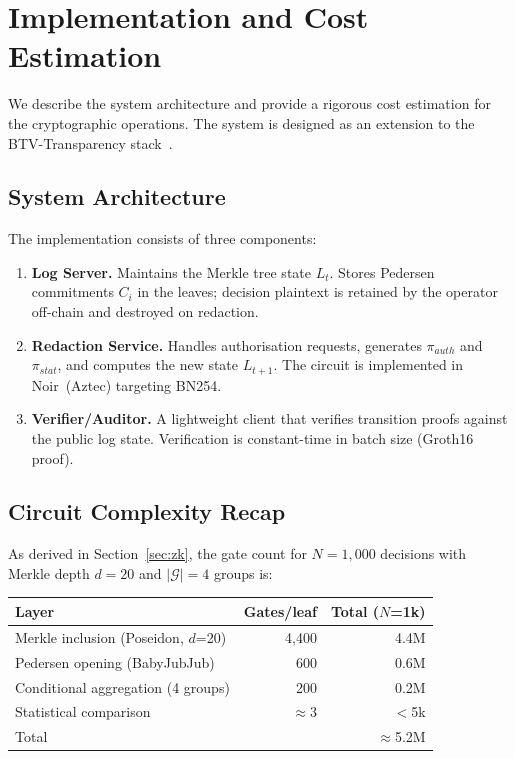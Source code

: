 \section{Implementation and Cost Estimation}
\label{sec:implementation}

We describe the system architecture and provide a rigorous cost
estimation for the cryptographic operations. The system is designed as
an extension to the BTV-Transparency stack~\cite{btv-t-repo}.

\subsection{System Architecture}

The implementation consists of three components:
\begin{enumerate}
  \item \textbf{Log Server.} Maintains the Merkle tree state $L_t$.
  Stores Pedersen commitments $C_i$ in the leaves; decision plaintext
  is retained by the operator off-chain and destroyed on redaction.
  \item \textbf{Redaction Service.} Handles authorisation requests,
  generates $\pi_{\mathit{auth}}$ and $\pi_{\mathit{stat}}$, and
  computes the new state $L_{t+1}$. The circuit is implemented in
  Noir~(Aztec) targeting BN254.
  \item \textbf{Verifier/Auditor.} A lightweight client that verifies
  transition proofs against the public log state. Verification is
  constant-time in batch size (Groth16 proof).
\end{enumerate}

\subsection{Circuit Complexity Recap}

As derived in Section~\ref{sec:zk}, the gate count for $N = 1{,}000$
decisions with Merkle depth $d = 20$ and $|\mathcal{G}| = 4$ groups is:

\begin{center}
\begin{tabular}{lrr}
\toprule
Layer & Gates/leaf & Total ($N$=1k) \\
\midrule
Merkle inclusion (Poseidon, $d$=20) & 4{,}400 & 4.4M \\
Pedersen opening (BabyJubJub) & 600 & 0.6M \\
Conditional aggregation (4 groups) & 200 & 0.2M \\
Statistical comparison & $\approx$3 & $<$5k \\
\midrule
Total & & $\approx$5.2M \\
\bottomrule
\end{tabular}
\end{center}

